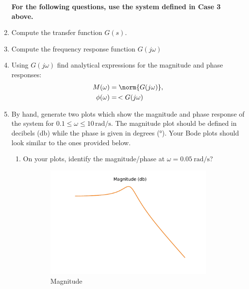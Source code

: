 \documentclass[11pt, reqno]{article}    %
\begin{document}
\begin{enumerate}
\begin{enumerate}
    \end{enumerate}
    \textbf{For the following questions, use the system defined in Case 3 above.}
    \item Compute the transfer function \( G(s) \). 
    \item Compute the frequency response function \( G(j \omega)\)
    \item Using \( G(j \omega) \) find analytical expressions for the magnitude and phase responses:
    \begin{align*}
        M(\omega) &= \norm{G(j \omega)}, \\
        \phi(\omega) &=\, < G(j \omega)
    \end{align*}
    \item By hand, generate two plots which show the magnitude and phase response of the system for \( 0.1 \leq \omega \leq 10 \, \si{\radian\per\second}\). The magnitude plot should be defined in decibels (\si{\decibel}) while the phase is given in degrees (\si{\degree}).
    Your Bode plots should look similar to the ones provided below.
    \begin{enumerate}
        \item On your plots, identify the magnitude/phase at \( \omega = \SI{0.05}{\radian\per\second}\)?
    \end{enumerate}
        \begin{figure}[htbp] 
        \centering 
        \begin{subfigure}[htbp]{0.5\textwidth} 
            \includegraphics[width=\textwidth]{mag.pdf} 
            \caption{Magnitude} 
        \end{subfigure}~ 
        \begin{subfigure}[htbp]{0.5\textwidth} 

\end{subfigure}
\end{figure}
\end{enumerate}
\end{document}
